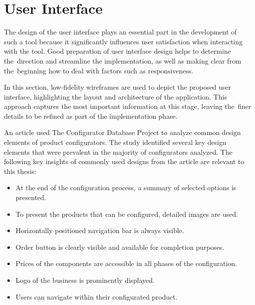 \section{User Interface} \label{section:wireframes}

The design of the user interface plays an essential part in the development of such a tool because it significantly influences user satisfaction when interacting with the tool. Good preparation of user interface design helps to determine the~direction and streamline the implementation, as well as making clear from the~beginning how to deal with factors such as responsiveness.

In this section, low-fidelity wireframes are used to depict the proposed user interface, highlighting the layout and architecture of the application. This approach captures the most important information at this stage, leaving the~finer details to be refined as part of the implementation phase.

An article \cite{Leitner2014} used The Configurator Database Project to analyze common design elements of product configurators. The study identified several key design elements that were prevalent in the majority of configurators analyzed. The following key insights of commonly used designs from the article are relevant to this thesis:
\begin{itemize}[label=\rectanglebullet]
    \item At the end of the configuration process, a summary of selected options is presented.
    \item To present the products that can be configured, detailed images are used.
    \item Horizontally positioned navigation bar is always visible.
    \item Order button is clearly visible and available for completion purposes.
    \item Prices of the components are accessible in all phases of the configuration.
    \item Logo of the business is prominently displayed.
    \item Users can navigate within their configurated product.
\end{itemize}

